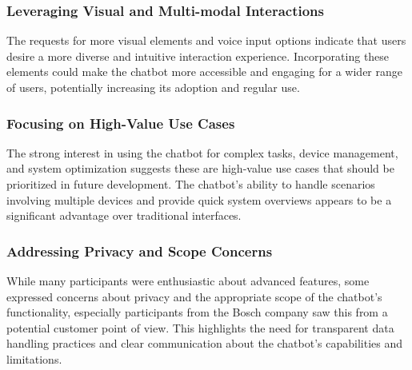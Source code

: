 \subsubsection{Leveraging Visual and Multi-modal Interactions}
The requests for more visual elements and voice input options indicate that users desire a more diverse and intuitive interaction experience. Incorporating these elements could make the chatbot more accessible and engaging for a wider range of users, potentially increasing its adoption and regular use.
\subsubsection{Focusing on High-Value Use Cases}
The strong interest in using the chatbot for complex tasks, device management, and system optimization suggests these are high-value use cases that should be prioritized in future development. The chatbot's ability to handle scenarios involving multiple devices and provide quick system overviews appears to be a significant advantage over traditional interfaces.
\subsubsection{Addressing Privacy and Scope Concerns}
While many participants were enthusiastic about advanced features, some expressed concerns about privacy and the appropriate scope of the chatbot's functionality, especially participants from the Bosch company saw this from a  potential customer point of view. This highlights the need for transparent data handling practices and clear communication about the chatbot's capabilities and limitations.

